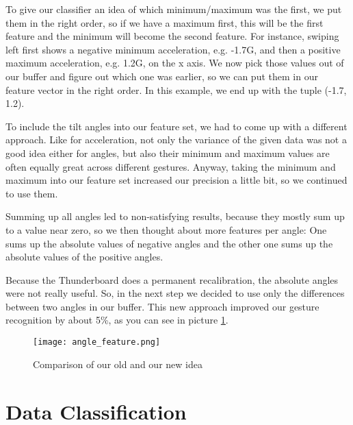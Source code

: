 To give our classifier an idea of which minimum/maximum was the first, we put them in the right order, so if we have a maximum first, this will be the first feature and the minimum will become the second feature.
For  instance,  swiping  left  first  shows  a negative  minimum  acceleration, e.g. -1.7G, and then a positive  maximum acceleration, e.g. 1.2G, on the x axis.
We now pick those values out of our buffer and figure out which one was earlier, so we can put them in our feature vector in the right order.
In  this example, we end up with the tuple (-1.7, 1.2).

To include the tilt angles into our feature set, we had to come up with a different approach.
Like for acceleration, not only the variance of the given data was not a good idea either for angles, but also their minimum and maximum values are often equally great across different gestures.
Anyway, taking the minimum and maximum into our feature set increased our precision a little bit, so we continued to use them.

Summing  up  all  angles  led  to non-satisfying  results, because they mostly sum up to a value near zero,  so  we  then thought about  more  features  per  angle:
One  sums  up  the absolute  values  of  negative  angles  and  the  other  one  sums  up  the  absolute values  of  the  positive  angles.

Because the Thunderboard does a permanent recalibration, the absolute angles were not really useful. So, in the next step we decided to use only the differences between two angles in our buffer.
This new approach improved our gesture recognition by about 5\%, as you can see in picture \ref{fig:angle_feature}.

\begin{figure}[htp]
\begin{center}
  \texttt{[image: angle\_feature.png]}
\caption{Comparison of our old and our new idea}\label{fig:angle_feature}
\end{center}
\end{figure}

\newpage 

\section{Data Classification}
\label{ch:DataCollection:sec:DataClassification}

